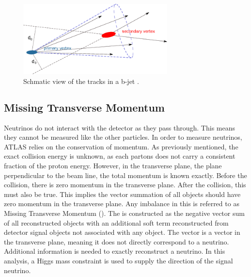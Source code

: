 \begin{figure}[h]
\begin{center}
\includegraphics*[width=0.70\textwidth] {figures/bjet}
\caption{Schmatic view of the tracks in a b-jet \cite{HanssonAdrian:1397942}.}
\label{fig:bjets}
\end{center}
\end{figure}

\subsection{Missing Transverse Momentum}
Neutrinos do not interact with the detector as they pass through. This means they cannot be measured like the other particles. In order to measure neutrinos, ATLAS relies on the conservation of momentum. As previously mentioned, the exact collision energy is unknown, as each partons does not carry a consistent fraction of the proton energy. However, in the transverse plane, the plane perpendicular to the beam line, the total momentum is known exactly. Before the collision, there is zero momentum in the transverse plane. After the collision, this must also be true. This implies the vector summation of all objects should have zero momentum in the transverse plane. Any imbalance in this is referred to as  Missing Transverse Momentum (\met). The \met{} is constructed as the negative vector sum of all reconstructed objects with an additional soft term reconstructed from detector signal objects not associated with any object\cite{ATL-PHYS-PUB-2015-027}. \newline
\indent The \met{} vector is a vector in the transverse plane, meaning it does not directly correspond to a neutrino. Additional information is needed to exactly reconstruct a neutrino. In this analysis, a Higgs mass constraint is used to supply the direction of the signal neutrino. \newline

